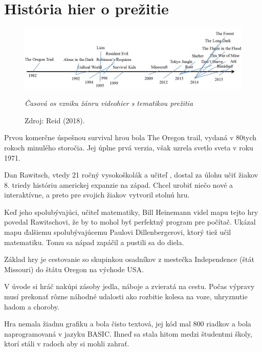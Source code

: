 \documentclass[10pt,oneoside,slovak,a4paper]{article}
\begin{document}
\section{História hier o prežitie }

\begin{figure}[h]
	\begin{flushleft}
		
		\includegraphics[width=12.5cm,keepaspectratio]{REID_graf.png}
		\caption{\textit{Časová os vzniku žánru videohier s tematikou prežitia}}
		\label{ fig:Časová os vzniku žánru videohier s tematikou prežitia}
  		\caption*{Zdroj: Reid (2018). \cite{Reid}}
		
	\end{flushleft}
\end{figure}

Prvou komerčne úspešnou survival hrou bola The Oregon trail, vydaná v 80tych rokoch minulého storočia. Jej úplne prvá verzia, však uzrela svetlo sveta v roku 1971. 

Dan Rawitsch, vtedy 21 ročný vysokoškolák a učiteľ , dostal za úlohu učiť žiakov 8. triedy históriu americkej expanzie na západ. Chcel urobiť niečo nové a interaktívne, a preto pre svojich žiakov vytvoril stolnú hru. \cite{Toppo}

Keď jeho spolubývajúci, učiteľ matematiky,  Bill Heinemann videl mapu tejto hry povedal Rawitschovi, že by to mohol byť perfektný program pre počítač. Ukázal mapu ďalšiemu spolubývajúcemu Paulovi Dillenbergerovi, ktorý tiež učil matematiku. Tomu sa nápad zapáčil a pustili sa do diela. 

Základ hry je cestovanie so skupinkou osadníkov z mestečka Independence (štát Missouri) do štátu Oregon na východe  USA.

V úvode si hráč nakúpi zásoby jedla, náboje a zvieratá na cestu.  Počas výpravy musí prekonať rôzne náhodné udalosti ako rozbitie kolesa na voze, uhryznutie hadom a choroby.

Hra nemala žiadnu grafiku a bola čisto textová, jej kód mal 800 riadkov a bola naprogramovaná v jazyku BASIC. Ihneď sa stala hitom medzi študentmi školy, ktorí stáli v radoch aby si mohli zahrať. 
\end{document}
